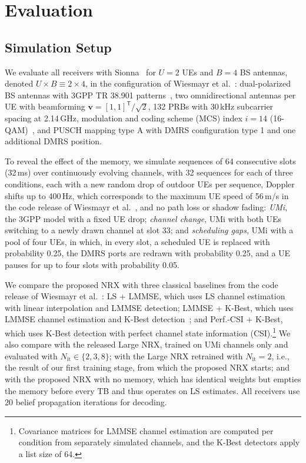 \section{Evaluation}

\subsection{Simulation Setup}
We evaluate all receivers with Sionna~\cite{hoydis2022} for $U=2$ UEs and $B=4$ BS antennas, denoted $U\times B\equiv 2\times 4$, in the configuration of Wiesmayr et al.~\cite{wiesmayr2025realtime}: dual-polarized BS antennas with 3GPP TR 38.901 patterns~\cite{tr38901}, two omnidirectional antennas per UE with beamforming $\mathbf{v}=[1,1]^{\mathsf{T}}/\sqrt{2}$, 132 PRBs with 30\,kHz subcarrier spacing at 2.14\,GHz, modulation and coding scheme (MCS) index $i=14$ (16-QAM)~\cite[Table~5.1.3.1-1]{3gpp38214}, and PUSCH mapping type A with DMRS configuration type 1 and one additional DMRS position.

To reveal the effect of the memory, we simulate sequences of 64 consecutive slots (32\,ms) over continuously evolving channels, with 32 sequences for each of three conditions, each with a new random drop of outdoor UEs per sequence, Doppler shifts up to 400\,Hz, which corresponds to the maximum UE speed of 56\,m/s in the code release of Wiesmayr et al.~\cite{wiesmayr2025realtime}, and no path loss or shadow fading: \emph{UMi}, the 3GPP model with a fixed UE drop; \emph{channel change}, UMi with both UEs switching to a newly drawn channel at slot 33; and \emph{scheduling gaps}, UMi with a pool of four UEs, in which, in every slot, a scheduled UE is replaced with probability 0.25, the DMRS ports are redrawn with probability 0.25, and a UE pauses for up to four slots with probability 0.05.

We compare the proposed NRX with three classical baselines from the code release of Wiesmayr et al.~\cite{wiesmayr2025realtime}: LS + LMMSE, which uses LS channel estimation with linear interpolation and LMMSE detection; LMMSE + K-Best, which uses LMMSE channel estimation and K-Best detection~\cite{guo2006}; and Perf.-CSI + K-Best, which uses K-Best detection with perfect channel state information (CSI).\footnote{Covariance matrices for LMMSE channel estimation are computed per condition from separately simulated channels, and the K-Best detectors apply a list size of 64.} We also compare with the released Large NRX, trained on UMi channels only and evaluated with $N_{\mathrm{it}}\in\{2,3,8\}$; with the Large NRX retrained with $N_{\mathrm{it}}=2$, i.e., the result of our first training stage, from which the proposed NRX starts; and with the proposed NRX with no memory, which has identical weights but empties the memory before every TB and thus operates on LS estimates. All receivers use 20 belief propagation iterations for decoding.

